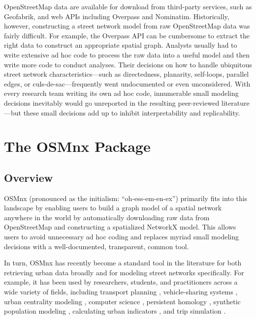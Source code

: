 \documentclass[12pt,letterpaper]{article} %
\begin{document}
OpenStreetMap data are available for download from third-party services, such as Geofabrik, and web APIs including Overpass and Nominatim. Historically, however, constructing a street network model from raw OpenStreetMap data was fairly difficult. For example, the Overpass API can be cumbersome to extract the right data to construct an appropriate spatial graph. Analysts usually had to write extensive ad hoc code to process the raw data into a useful model and then write more code to conduct analyses. Their decisions on how to handle ubiquitous street network characteristics---such as directedness, planarity, self-loops, parallel edges, or culs-de-sac---frequently went undocumented or even unconsidered. With every research team writing its own ad hoc code, innumerable small modeling decisions inevitably would go unreported in the resulting peer-reviewed literature---but these small decisions add up to inhibit interpretability and replicability.

\section{The OSMnx Package}

\subsection{Overview}

OSMnx (pronounced as the initialism: \enquote{oh-ess-em-en-ex}) primarily fits into this landscape by enabling users to build a graph model of a spatial network anywhere in the world by automatically downloading raw data from OpenStreetMap and constructing a spatialized NetworkX model. This allows users to avoid unnecessary ad hoc coding and replaces myriad small modeling decisions with a well-documented, transparent, common tool.

In turn, OSMnx has recently become a standard tool in the literature for both retrieving urban data broadly and for modeling street networks specifically. For example, it has been used by researchers, students, and practitioners across a wide variety of fields, including transport planning \citep[e.g.,][]{natera_orozco_data-driven_2020,dumedah_case_2020}, vehicle-sharing systems \citep[e.g.,][]{luo_d3p_2020,zhang_electric_2019}, urban centrality modeling \citep[e.g.,][]{wang_road_2020,torres_alisis_2019}, computer science \citep[e.g.,][]{yin_multi-task_2020,young_automatic_2020}, persistent homology \citep[e.g.,][]{feng_spatial_2020,abdelkader_topological_2018}, synthetic population modeling \citep[e.g.,][]{tuccillo_likeness_2022,tuccillo_spatial_2023}, calculating urban indicators \citep[e.g.,][]{quistberg_building_2019,wang_impacts_2020}, and trip simulation \citep[e.g.,][]{hernandez-hernandez_anger_2019,merchan_quantifying_2020}.
\end{document}
